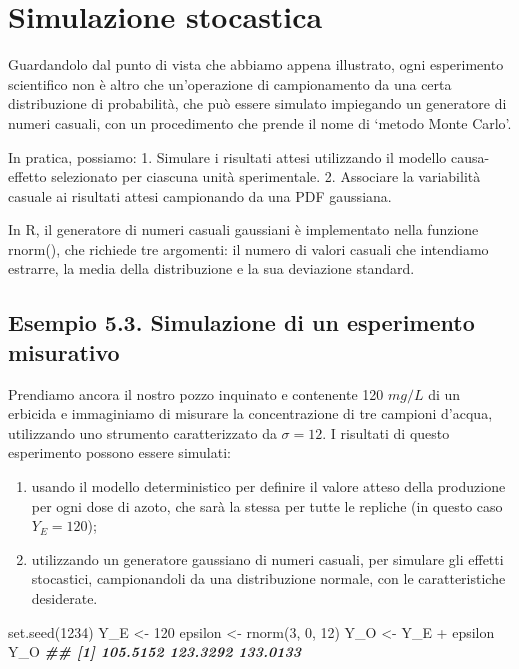\documentclass[
  12pt,
]{book}
\newenvironment{Shaded}{\begin{snugshade}}{\end{snugshade}}
\newcommand{\DecValTok}[1]{\textcolor[rgb]{0.00,0.00,0.81}{#1}}
\newcommand{\DocumentationTok}[1]{\textcolor[rgb]{0.56,0.35,0.01}{\textbf{\textit{#1}}}}
\newcommand{\FunctionTok}[1]{\textcolor[rgb]{0.00,0.00,0.00}{#1}}
\newcommand{\NormalTok}[1]{#1}
\newcommand{\OtherTok}[1]{\textcolor[rgb]{0.56,0.35,0.01}{#1}}
\newcommand{\SpecialCharTok}[1]{\textcolor[rgb]{0.00,0.00,0.00}{#1}}
\providecommand{\tightlist}{%
  \setlength{\itemsep}{0pt}\setlength{\parskip}{0pt}}
\begin{document}
\hypertarget{simulazione-stocastica}{%
\section{Simulazione stocastica}\label{simulazione-stocastica}}

Guardandolo dal punto di vista che abbiamo appena illustrato, ogni esperimento scientifico non è altro che un'operazione di campionamento da una certa distribuzione di probabilità, che può essere simulato impiegando un generatore di numeri casuali, con un procedimento che prende il nome di `metodo Monte Carlo'.

In pratica, possiamo:
1. Simulare i risultati attesi utilizzando il modello causa-effetto selezionato per ciascuna unità sperimentale.
2. Associare la variabilità casuale ai risultati attesi campionando da una PDF gaussiana.

In R, il generatore di numeri casuali gaussiani è implementato nella funzione rnorm(), che richiede tre argomenti: il numero di valori casuali che intendiamo estrarre, la media della distribuzione e la sua deviazione standard.

\hypertarget{esempio-5.3.-simulazione-di-un-esperimento-misurativo}{%
\subsection{Esempio 5.3. Simulazione di un esperimento misurativo}\label{esempio-5.3.-simulazione-di-un-esperimento-misurativo}}

Prendiamo ancora il nostro pozzo inquinato e contenente 120 \(mg/L\) di un erbicida e immaginiamo di misurare la concentrazione di tre campioni d'acqua, utilizzando uno strumento caratterizzato da \(\sigma = 12\). I risultati di questo esperimento possono essere simulati:

\begin{enumerate}
\def\labelenumi{\arabic{enumi}.}
\tightlist
\item
  usando il modello deterministico per definire il valore atteso della produzione per ogni dose di azoto, che sarà la stessa per tutte le repliche (in questo caso \(Y_E = 120\));
\item
  utilizzando un generatore gaussiano di numeri casuali, per simulare gli effetti stocastici, campionandoli da una distribuzione normale, con le caratteristiche desiderate.
\end{enumerate}

\begin{Shaded}
\begin{Highlighting}[]
\FunctionTok{set.seed}\NormalTok{(}\DecValTok{1234}\NormalTok{)}
\NormalTok{Y\_E }\OtherTok{\textless{}{-}} \DecValTok{120}
\NormalTok{epsilon }\OtherTok{\textless{}{-}} \FunctionTok{rnorm}\NormalTok{(}\DecValTok{3}\NormalTok{, }\DecValTok{0}\NormalTok{, }\DecValTok{12}\NormalTok{)}
\NormalTok{Y\_O }\OtherTok{\textless{}{-}}\NormalTok{ Y\_E }\SpecialCharTok{+}\NormalTok{ epsilon}
\NormalTok{Y\_O}
\DocumentationTok{\#\# [1] 105.5152 123.3292 133.0133}
\end{Highlighting}
\end{Shaded}
\end{document}
